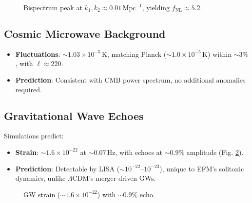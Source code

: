 \documentclass{article}
\begin{document}
\begin{figure}[ht]
    \centering
    \caption{Bispectrum peak at \( k_1, k_2 \approx 0.01 \, \text{Mpc}^{-1} \), yielding \( f_{\text{NL}} \approx 5.2 \).}
    \label{fig:bispectrum}
\end{figure}

\subsection{Cosmic Microwave Background}
\begin{itemize}
    \item \textbf{Fluctuations}: \(\sim 1.03 \times 10^{-5} \, \text{K}\), matching Planck (\(\sim 1.0 \times 10^{-5} \, \text{K}\)) within \(\sim 3\%\), with \(\ell \approx 220\).
    \item \textbf{Prediction}: Consistent with CMB power spectrum, no additional anomalies required.
\end{itemize}

\subsection{Gravitational Wave Echoes}
Simulations predict:
\begin{itemize}
    \item \textbf{Strain}: \(\sim 1.6 \times 10^{-22}\) at \(\sim 0.07 \, \text{Hz}\), with echoes at \(\sim 0.9\%\) amplitude (Fig. \ref{fig:gw}).
    \item \textbf{Prediction}: Detectable by LISA (\(\sim 10^{-22}–10^{-23}\)), unique to EFM’s solitonic dynamics, unlike \(\Lambda\)CDM’s merger-driven GWs.
\end{itemize}

\begin{figure}[ht]
    \centering
    \caption{GW strain (\(\sim 1.6 \times 10^{-22}\)) with \(\sim 0.9\%\) echo.}
    \label{fig:gw}
\end{figure}
\end{document}
